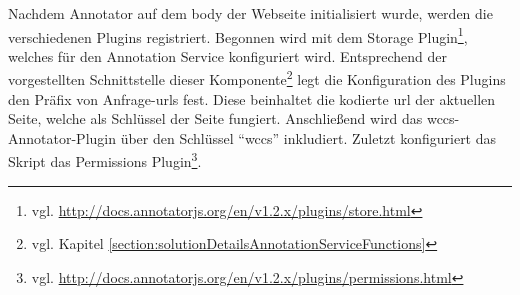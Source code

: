     Nachdem Annotator auf dem body der Webseite initialisiert wurde,
    werden die verschiedenen Plugins registriert.
    Begonnen wird mit dem
    Storage Plugin\footnote{vgl. \url{http://docs.annotatorjs.org/en/v1.2.x/plugins/store.html}},
    welches für den Annotation Service konfiguriert wird.
    Entsprechend der vorgestellten Schnittstelle dieser
    Komponente\footnote{vgl. Kapitel \ref{section:solutionDetailsAnnotationServiceFunctions}}
    legt die Konfiguration des Plugins den Präfix von Anfrage-\glspl{url} fest.
    Diese beinhaltet die kodierte \gls{url} der aktuellen Seite,
    welche als Schlüssel der Seite fungiert.
    Anschließend wird das \gls{wccs}-Annotator-Plugin über den Schlüssel "`wccs"' inkludiert.
    Zuletzt konfiguriert das Skript das
    Permissions Plugin\footnote{vgl. \url{http://docs.annotatorjs.org/en/v1.2.x/plugins/permissions.html}}.
